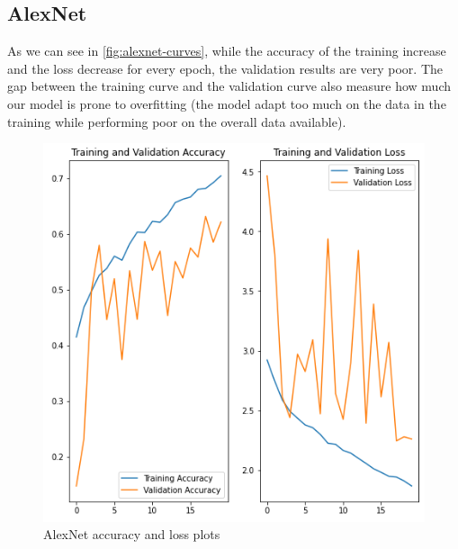 \documentclass[11pt]{article}
\begin{document}
	\subsection{AlexNet}
	As we can see in \autoref{fig:alexnet-curves}, while the accuracy of the
	training increase and the loss decrease for every epoch, the validation
	results are very poor. The gap between the training curve and the validation
	curve also measure how much our model is prone to overfitting (the model
	adapt too much on the data in the training while performing poor on the overall data available).

	\begin{figure}[H]
		\centering
		\includegraphics[width=.8\textwidth]{assets/AlexNet_plots.png}
		\caption{AlexNet accuracy and loss plots}
		\label{fig:alexnet-curves}
	\end{figure}
\end{document}
